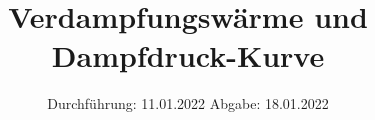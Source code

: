 

\subject{Versuch 203}
\title{Verdampfungswärme und Dampfdruck-Kurve}
\date{%
  Durchführung: 11.01.2022
  \hspace{3em}
  Abgabe: 18.01.2022
}



\maketitle
\thispagestyle{empty}
\tableofcontents
\newpage






\nocite{*}
\printbibliography{}



